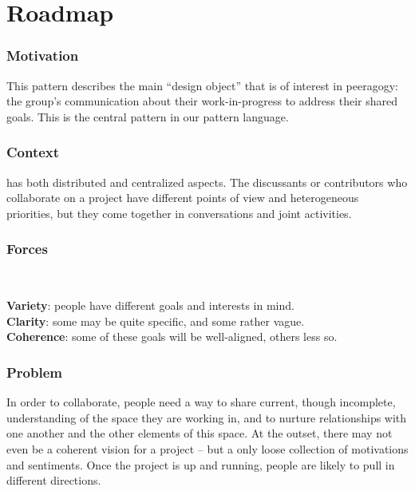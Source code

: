 
\section{Roadmap} \label{sec:Roadmap}



\subsubsection*{Motivation} This pattern describes the main ``design object'' that is of interest in peeragogy: the group's communication about their work-in-progress to address their shared goals.  This is the central pattern in our pattern language. 


\subsubsection*{Context}  has both distributed and centralized aspects. The discussants or contributors who collaborate on a project have different points of view and heterogeneous priorities, but they come together in conversations and joint activities.

\subsubsection*{Forces}~
\parbox[t]{.85\textwidth}{
\textbf{Variety}: people have different goals and interests in mind.\\
\textbf{Clarity}: some may be quite specific, and some rather vague.\\
\textbf{Coherence}: some of these goals will be well-aligned, others less so.
}

\subsubsection*{Problem} In order to collaborate, people need a way to share current, though incomplete, understanding of the space they are working in, and to nurture relationships with one another and the other elements of this space.  At the outset, there may not even be a coherent vision for a project -- but a only loose collection of motivations and sentiments.  Once the project is up and running, people are likely to pull in different directions.   

